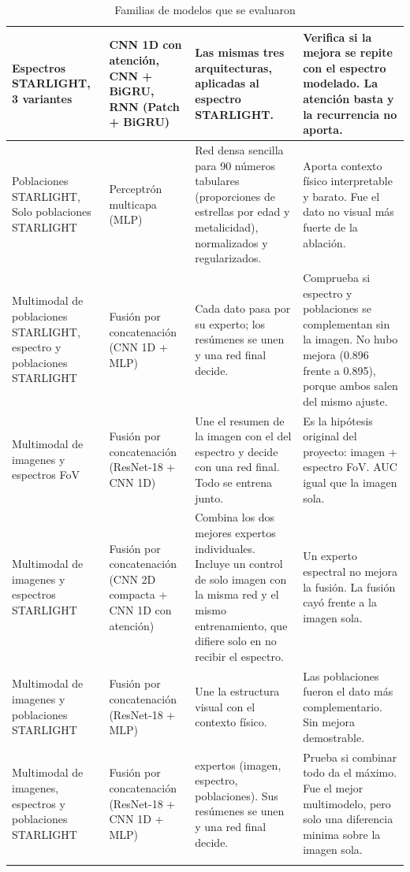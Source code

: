 \documentclass[12pt]{article}
\begin{document}
\begin{longtable}{|>{\raggedright\arraybackslash}p{}|>{\raggedright\arraybackslash}p{}|>{\raggedright\arraybackslash}p{}|>{\raggedright\arraybackslash}p{}|}
Espectros STARLIGHT, 3 variantes &
CNN 1D con atención, CNN + BiGRU, RNN (Patch + BiGRU) &
Las mismas tres arquitecturas, aplicadas al espectro STARLIGHT. &
Verifica si la mejora se repite con el espectro modelado. La atención basta y la recurrencia no aporta. \\ \hline

Poblaciones STARLIGHT, Solo poblaciones STARLIGHT &
Perceptrón multicapa (MLP) &
Red densa sencilla para 90 números tabulares (proporciones de estrellas por edad y metalicidad), normalizados y regularizados. &
Aporta contexto físico interpretable y barato. Fue el dato no visual más fuerte de la ablación. \\ \hline

Multimodal de poblaciones STARLIGHT, espectro y poblaciones STARLIGHT &
Fusión por concatenación (CNN 1D + MLP) &
Cada dato pasa por su experto; los resúmenes se unen y una red final decide. &
Comprueba si espectro y poblaciones se complementan sin la imagen. No hubo mejora (0.896 frente a 0.895), porque ambos salen del mismo ajuste. \\ \hline

Multimodal de imagenes y espectros FoV &
Fusión por concatenación (ResNet-18 + CNN 1D) &
Une el resumen de la imagen con el del espectro y decide con una red final. Todo se entrena junto. &
Es la hipótesis original del proyecto: imagen + espectro FoV. AUC igual que la imagen sola. \\ \hline

Multimodal de imagenes y espectros STARLIGHT &
Fusión por concatenación (CNN 2D compacta + CNN 1D con atención) &
Combina los dos mejores expertos individuales. Incluye un control de solo imagen con la misma red y el mismo entrenamiento, que difiere solo en no recibir el espectro. &
Un experto espectral no mejora la fusión. La fusión cayó frente a la imagen sola. \\ \hline

Multimodal de imagenes y poblaciones STARLIGHT &
Fusión por concatenación (ResNet-18 + MLP) &
Une la estructura visual con el contexto físico. &
Las poblaciones fueron el dato más complementario. Sin mejora demostrable. \\ \hline

Multimodal de imagenes, espectros y poblaciones STARLIGHT &
Fusión por concatenación (ResNet-18 + CNN 1D + MLP) &
3 expertos (imagen, espectro, poblaciones). Sus resúmenes se unen y una red final decide. &
Prueba si combinar todo da el máximo. Fue el mejor multimodelo, pero solo una diferencia minima sobre la imagen sola. \\ \hline

\caption{Familias de modelos que se evaluaron}
\label{modelos}
\end{longtable}
\end{document}
